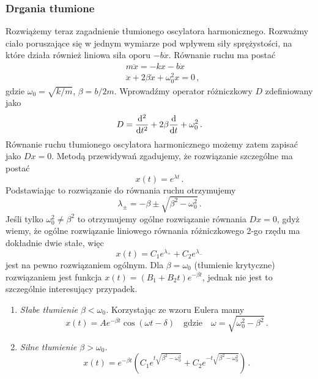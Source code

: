 \documentclass[../main.tex]{subfiles}
\begin{document}
    \subsubsection{Drgania tłumione}
    Rozwiążemy teraz zagadnienie tłumionego oscylatora harmonicznego. Rozważmy ciało poruszające się w jednym wymiarze pod wpływem siły sprężystości, na które działa również liniowa siła oporu \(-b\dot x\). Równanie ruchu ma postać
    \begin{equation*}
        \begin{split}
            &m\ddot x=-kx-b\dot x\\
            &\ddot x+2\beta\dot x+\omega_0^2x=0\,,
        \end{split}
    \end{equation*}
    gdzie \(\omega_0=\sqrt{k/m}\), \(\beta=b/2m\). Wprowadźmy operator różniczkowy \(D\) zdefiniowany jako
    \begin{equation*}
        D=\dv[2]{}{t}+2\beta\dv{}{t}+\omega_0^2\,.
    \end{equation*}
    Równanie ruchu tłumionego oscylatora harmonicznego możemy zatem zapisać jako \(Dx=0\). Metodą przewidywań zgadujemy, że rozwiązanie szczególne ma postać
    \begin{equation*}
        x(t)=e^{\lambda t}\,.
    \end{equation*}
    Podstawiając to rozwiązanie do równania ruchu otrzymujemy
    \begin{equation*}
        \lambda_\pm=-\beta\pm\sqrt{\beta^2-\omega_0^2}\,.
    \end{equation*}
    Jeśli tylko \(\omega_0^2\neq\beta^2\) to otrzymujemy ogólne rozwiązanie równania \(Dx=0\), gdyż wiemy, że ogólne rozwiązanie liniowego równania różniczkowego 2-go rzędu ma dokładnie dwie stałe, więc
    \begin{equation*}
        x(t)=C_1e^{\lambda_{+}}+C_2e^{\lambda_{-}}
    \end{equation*}
    jest na pewno rozwiązaniem ogólnym. Dla \(\beta=\omega_0\) (tłumienie krytyczne) rozwiązaniem jest funkcja \(x(t)=(B_1+B_2t)e^{-\beta t}\), jednak nie jest to szczególnie interesujący przypadek.
    \begin{enumerate}
        \item \textit{Słabe tłumienie \(\beta<\omega_0\).} Korzystając ze wzoru Eulera mamy
        \begin{equation*}
            x(t)=Ae^{-\beta t}\cos(\omega t-\delta)\quad\text{gdzie}\quad \omega=\sqrt{\omega_0^2-\beta^2}\,.
        \end{equation*}
        
        \item \textit{Silne tłumienie \(\beta>\omega_0\).} 
        \begin{equation*}
            x(t)=e^{-\beta t}\left(C_1e^{t\sqrt{\beta^2-\omega_0^2}}+C_2e^{-t\sqrt{\beta^2-\omega_0^2}}\right)\,.
        \end{equation*}
    \end{enumerate}
\end{document}
